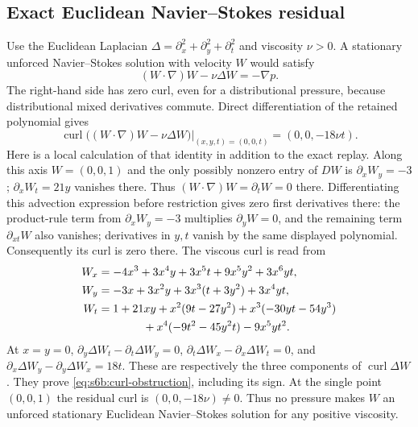 \subsection{Exact Euclidean Navier--Stokes residual}
Use the Euclidean Laplacian
$\Delta=\partial_x^2+\partial_y^2+\partial_t^2$ and viscosity $\nu>0$.
A stationary unforced Navier--Stokes solution with velocity $W$ would satisfy
\begin{equation}
 (W\cdot\nabla)W-\nu\Delta W=-\nabla p.
 \label{eq:s6b:steady-ns}
\end{equation}
The right-hand side has zero curl, even for a distributional pressure,
because distributional mixed derivatives commute.  Direct differentiation
of the retained polynomial gives
\begin{equation}
 \left.\operatorname{curl}\bigl((W\cdot\nabla)W-\nu\Delta W\bigr)
 \right|_{(x,y,t)=(0,0,t)}=(0,0,-18\nu t).
 \label{eq:s6b:curl-obstruction}
\end{equation}
Here is a local calculation of that identity in addition to the exact replay.
Along this axis $W=(0,0,1)$ and the only possibly nonzero entry of $DW$ is
$\partial_xW_y=-3$; $\partial_xW_t=21y$ vanishes there.  Thus
$(W\cdot\nabla)W=\partial_tW=0$ there.  Differentiating this advection
expression before restriction gives zero first derivatives there: the
product-rule term from $\partial_xW_y=-3$ multiplies $\partial_yW=0$,
and the remaining term $\partial_{xt}W$ also vanishes; derivatives in
$y,t$ vanish by the same displayed polynomial.
Consequently its curl is zero there.  The viscous curl is read from
\begin{align*}
 W_x&=-4x^3+3x^4y+3x^5t+9x^5y^2+3x^6yt,\\
 W_y&=-3x+3x^2y+3x^3(t+3y^2)+3x^4yt,\\
 W_t&=1+21xy+x^2(9t-27y^2)+x^3(-30yt-54y^3)\\
    &\hspace{14mm}+x^4(-9t^2-45y^2t)-9x^5yt^2.
\end{align*}
At $x=y=0$,
$\partial_y\Delta W_t-\partial_t\Delta W_y=0$,
$\partial_t\Delta W_x-\partial_x\Delta W_t=0$, and
$\partial_x\Delta W_y-\partial_y\Delta W_x=18t$.
These are respectively the three components of $\operatorname{curl}\Delta W$.
They prove \eqref{eq:s6b:curl-obstruction}, including its sign.
At the single point $(0,0,1)$ the residual curl is $(0,0,-18\nu)\ne0$.
Thus no pressure makes $W$ an unforced stationary Euclidean Navier--Stokes
solution for any positive viscosity.

